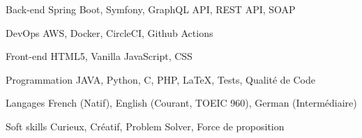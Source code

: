 

\begin{cvskills}

\cvskill
  {Back-end} %
  {Spring Boot, Symfony, GraphQL API, REST API, SOAP} %

  \cvskill
    {DevOps} %
    {AWS, Docker, CircleCI, Github Actions} %

  \cvskill
    {Front-end} %
    {HTML5, Vanilla JavaScript, CSS} %

  \cvskill
    {Programmation} %
    {JAVA, Python, C, PHP, LaTeX, Tests, Qualité de Code} %

  \cvskill
    {Langages} %
    {French (Natif), English (Courant, TOEIC 960), German (Intermédiaire)} %

  \cvskill
    {Soft skills} %
    {Curieux, Créatif, Problem Solver, Force de proposition} %

\end{cvskills}
